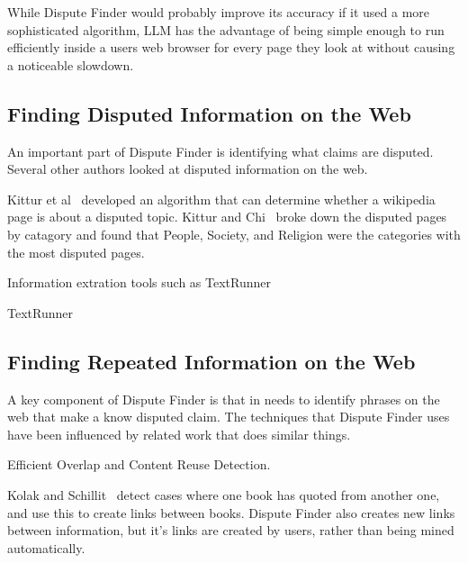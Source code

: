 \documentclass{www2010-submission}
\newcommand{\todo}[1]{}
\begin{document}
While Dispute Finder would probably improve its accuracy if it used a more sophisticated algorithm, LLM has the advantage of being simple enough to run efficiently inside a users web browser for every page they look at without causing a noticeable slowdown. 

\todo{Do human-guided approach that works well? Talk more about human guided task.}


\subsection{Finding Disputed Information on the Web}

An important part of Dispute Finder is identifying what claims are disputed. Several other authors looked at disputed information on the web.

Kittur et al~\cite{Kittur2007} developed an algorithm that can determine whether a wikipedia page is about a disputed topic. Kittur and Chi~\cite{Kittur2009} broke down the disputed pages by catagory and found that People, Society, and Religion were the categories with the most disputed pages.

Information extration tools such as TextRunner~\cite{Etzioni2008} 

TextRunner~\cite{Etzioni2008} 

\todo{cite lots of Etzioni stuff}


\todo{Online Dispute Resolution}

\todo{Cite Kittur et al}


\subsection{Finding Repeated Information on the Web}

\todo{Cite google quotation stuff and Ed Chi movable quotations stuff}


A key component of Dispute Finder is that in needs to identify phrases on the web that make a know disputed claim. The techniques that Dispute Finder uses have been influenced by related work that does similar things.

\cite{Kim2009} Efficient Overlap and Content Reuse Detection.

\cite{schillit?}

Kolak and Schillit~\cite{Kolak2008} detect cases where one book has quoted from another one, and use this to create links between books. Dispute Finder also creates new links between information, but it's links are created by users, rather than being mined automatically.
\end{document}
